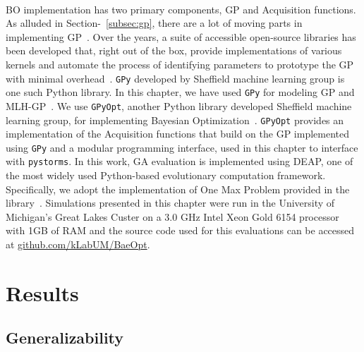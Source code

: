 \

BO implementation has two primary components, GP and Acquisition functions. 
As alluded in Section-~\ref{subsec:gp}, there are a lot of moving parts in implementing GP~\cite{frazier2018tutorial}.
Over the years, a suite of accessible open-source libraries has been developed that, right out of the box, provide implementations of various kernels and automate the process of identifying parameters to prototype the GP with minimal overhead~\cite{gpy2014, scikit-learn, daulton2020differentiable}.
\texttt{GPy} developed by Sheffield machine learning group is one such Python library.
In this chapter, we have used \texttt{GPy} for modeling GP and MLH-GP~\cite{gpy2014}. 
We use \texttt{GPyOpt}, another Python library developed Sheffield machine learning group, for implementing Bayesian Optimization~\cite{gpyopt2016}. 
\texttt{GPyOpt} provides an implementation of the Acquisition functions that build on the GP implemented using \texttt{GPy} and a modular programming interface, used in this chapter to interface with \texttt{pystorms}.
In this work, GA evaluation is implemented using DEAP, one of the most widely used Python-based evolutionary computation framework\cite{fortin12a}. Specifically, we adopt the implementation of One Max Problem provided in the library~\cite{One}.
Simulations presented in this chapter were run in the University of Michigan's Great Lakes Custer on a 3.0 GHz Intel Xeon Gold 6154 processor with 1GB of RAM and the source code used for this evaluations can be accessed at \href{https://github.com/kLabUM/BaeOpt}{github.com/kLabUM/BaeOpt}.

\section{Results}
\subsection{Generalizability}

